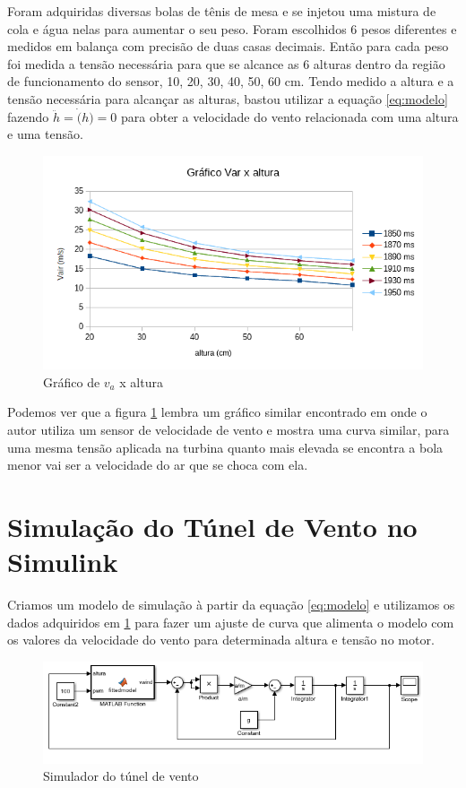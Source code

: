 Foram adquiridas diversas bolas de tênis de mesa e se injetou uma mistura de cola e água nelas para aumentar o seu peso. Foram escolhidos 6 pesos diferentes e medidos em balança com precisão de duas casas decimais. Então para cada peso foi medida a tensão necessária para que se alcance as 6 alturas dentro da região de funcionamento do sensor, 10, 20, 30, 40, 50, 60 cm. Tendo medido a altura e a tensão necessária para alcançar as alturas, bastou utilizar a equação \eqref{eq:modelo} fazendo $\ddot{h}=\dot(h)=0$ para obter a velocidade do vento relacionada com uma altura e uma tensão.

\begin{figure}[h]
	\centering
	\includegraphics{grafico_vair_altura}
	\caption[Gráfico $v_a$ x altura]{Gráfico de $v_a$ x altura}
	\label{fig:graficovairaltura1}
\end{figure}

Podemos ver que a figura \ref{fig:graficovairaltura1} lembra um gráfico similar encontrado em \cite{jernigan2009} onde o autor utiliza um sensor de velocidade de vento e mostra uma curva similar, para uma mesma tensão aplicada na turbina quanto mais elevada se encontra a bola menor vai ser a velocidade do ar que se choca com ela.

\section{Simulação do Túnel de Vento no Simulink}

Criamos um modelo de simulação à partir da equação \ref{eq:modelo} e utilizamos os dados adquiridos em \ref{fig:graficovairaltura1} para fazer um ajuste de curva que alimenta o modelo com os valores da velocidade do vento para determinada altura e tensão no motor.

\begin{figure}[h]
	\centering
	\includegraphics{simulador}
	\caption[Simulador do túnel de vento]{Simulador do túnel de vento}
	\label{fig:simulador}
\end{figure}




